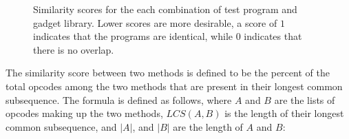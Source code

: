 \documentclass[finalcopy,short]{srpaper}
\begin{document}
        \begin{figure}[t]
            \vspace{-50pt}
            \caption{Similarity scores for the each combination of test program
            and gadget library. Lower scores are more desirable, a score of $1$
            indicates that the programs are identical, while $0$ indicates that
            there is no overlap.}
            \label{tab:results-different}
        \end{figure}
        The similarity score between two methods is defined to be the percent of
        the total opcodes among the two methods that are present in their longest
        common subsequence. The formula is defined as follows, where
        $A$ and $B$ are the lists of opcodes making up the two methods,
        $LCS(A,B)$ is the length of their longest common subsequence, and $|A|$,
        and $|B|$ are the length of $A$ and $B$:
\end{document}
